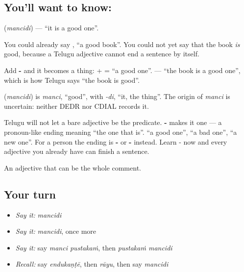 \subsection*{You'll want to know: }
\textbf{} (\emph{mancidi}) — \textquotedblleft{}it is a good one\textquotedblright{}.

You could already say \textbf{ }, \textquotedblleft{}a good book\textquotedblright{}. You could not yet say that the book \emph{is} good, because a Telugu adjective cannot end a sentence by itself.

Add \textbf{-} and it becomes a thing:  +  = \textquotedblleft{}a good one\textquotedblright{}. \textbf{ } — \textquotedblleft{}the book is a good one\textquotedblright{}, which is how Telugu says \textquotedblleft{}the book is good\textquotedblright{}.

\begin{cousinweb}
\textbf{} (\emph{mancidi}) is \emph{manci}, \textquotedblleft{}good\textquotedblright{}, with \emph{-di}, \textquotedblleft{}it, the thing\textquotedblright{}. The origin of \emph{manci} is uncertain: neither DEDR nor CDIAL records it.
\end{cousinweb}

\begin{grammarlens}[title={Grammar Lens: -\te{ది} turns a describing word into a naming word}]
Telugu will not let a bare adjective be the predicate. \textbf{-} makes it one — a pronoun-like ending meaning \textquotedblleft{}the one that is\textquotedblright{}.  \textquotedblleft{}a good one\textquotedblright{},  \textquotedblleft{}a bad one\textquotedblright{},  \textquotedblleft{}a new one\textquotedblright{}. For a person the ending is \textbf{-} or \textbf{-} instead. Learn - now and every adjective you already have can finish a sentence.
\end{grammarlens}

\begin{grammarlens}[title={What you've built}]
An adjective that can be the whole comment.
\end{grammarlens}

\subsection*{Your turn}
\begin{itemize}
\raggedright
  \item \emph{Say it:} \emph{mancidi}
  \item \emph{Say it:} \emph{mancidi}, once more
  \item \emph{Say it:} say \emph{manci pustakaṁ}, then \emph{pustakaṁ mancidi}
  \item \emph{Recall:} say \emph{endukaṇṭē}, then \emph{rāyu}, then say \emph{mancidi}
\end{itemize}

